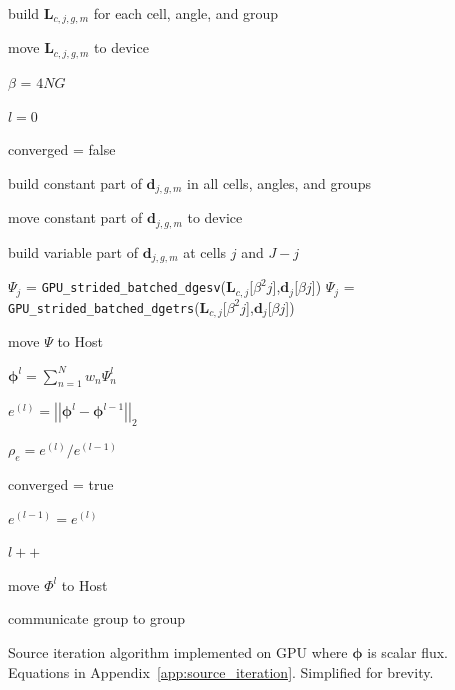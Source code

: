 \begin{algorithm}
\begin{algorithmic}[1]
    \State build $\mathbf{L}_{c,j,g,m}$ for each cell, angle, and group 
    
    \State move $\mathbf{L}_{c,j,g,m}$ to device

    \State $\beta$ = $4NG$  %

    \State $l = 0$ 

    \State converged = false


    \State build constant part of $\bm{d}_{j,g,m}$ in all cells, angles, and groups 

    \State move constant part of $\bm{d}_{j,g,m}$ to device
        
         

            \State build variable part of $\bm{d}_{j,g,m}$ at cells $j$ and $J-j$  

                \State $\Psi_j$ = \texttt{GPU\_strided\_batched\_dgesv}($\mathbf{L}_{c,j}$[$\beta^{2}j$],$\bm{d}_{j}$[$\beta j$])
            \Else
                \State $\Psi_j$ = \texttt{GPU\_strided\_batched\_dgetrs}($\mathbf{L}_{c,j}$[$\beta^2j$],$\bm{d}_{j}$[$\beta j$]) 
            \EndIf
        \EndFor

        \State move $\Psi$ to Host

        \State $\bm{\phi}^l =\sum_{n=1}^{N} w _n\Psi^{l}_{n}$ 

        \State $e^{(l)}=\left|\left|\bm{\phi}^l - \bm{\phi}^{l-1}\right|\right|_2$

        \State $\rho_e = e^{(l)} / e^{(l-1)}$

            converged = true
        \EndIf

        \State $e^{(l-1)} = e^{(l)}$ 

        \State $l++$
        
        \State move $\Phi^l$ to Host

        \State communicate group to group 

    \EndWhile
    \vspace{1.5em}
    \caption{Source iteration algorithm implemented on GPU where $\bm\phi$ is scalar flux. Equations in Appendix~\ref{app:source_iteration}. Simplified for brevity.}
    \label{alg:si}
\end{algorithmic}
\end{algorithm}

